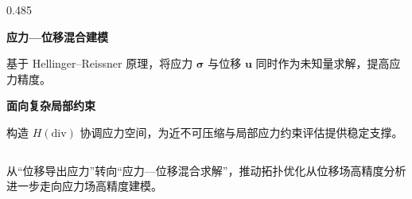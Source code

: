 \documentclass[notheorems]{beamer}
\begin{document}
\begin{frame}
\begin{columns}[T, totalwidth=\linewidth]
\begin{column}{0.485\linewidth}
\begin{tcolorbox}
{						\textbf{\enspace 应力—位移混合建模}\par
						\vspace{2pt}
						基于 Hellinger–Reissner 原理，将应力 $\boldsymbol{\sigma}$ 与位移 $\boldsymbol{u}$ 同时作为未知量求解，提高应力精度。
						
						\vspace{8pt}
						\textbf{\enspace 面向复杂局部约束}\par
						\vspace{2pt}
						构造 $H(\text{div})$ 协调应力空间，为近不可压缩与局部应力约束评估提供稳定支撑。
					}
				\end{tcolorbox}
			\end{column}
			
		\end{columns}
		
		\begin{tcolorbox}[
			colback=structure.fg, colframe=structure.fg,
			arc=3pt, boxrule=0pt,
			top=4pt, bottom=4pt, left=8pt, right=8pt]
			\centering
			{\fontsize{8.5}{12}\selectfont\sffamily\color{white}
				从“位移导出应力”转向“应力—位移混合求解”，推动拓扑优化从位移场高精度分析进一步走向应力场高精度建模。}
		\end{tcolorbox}
		
	\end{frame}
	
	
\end{document}
